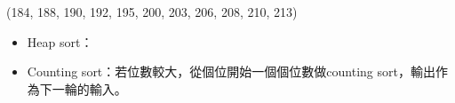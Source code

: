\begin{theorem}{(184, 188, 190, 192, 195, 200, 203, 206, 208, 210, 213)}
\begin{itemize}
        \item Heap sort：
        \begin{algorithm}[H]
            \begin{algorithmic}[1]
                 
                     
                        \State {} 
                    \EndFor
                        \State {} 
                        \State {} 
                    \EndFor
                \EndFunction
            \end{algorithmic}
        \end{algorithm}
        \item Counting sort：若位數較大，從個位開始一個個位數做counting sort，輸出作為下一輪的輸入。
    \end{itemize}
\end{theorem}

